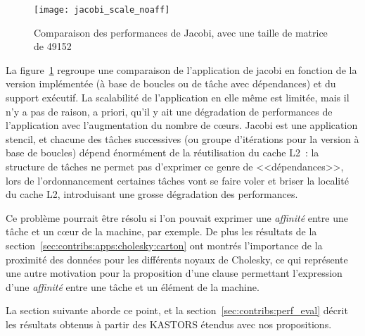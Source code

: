 \begin{figure}[ht]
  \centering
  \texttt{[image: jacobi\_scale\_noaff]}
  \caption{Comparaison des performances de Jacobi, avec une taille de matrice de 49152}\label{fig:contribs:openmp:kastors:jacobi-motiv}
\end{figure}

La figure~\ref{fig:contribs:openmp:kastors:jacobi-motiv} regroupe une comparaison de l'application de jacobi en fonction de la version implémentée (à base de boucles ou de tâche avec dépendances) et du support exécutif.
La scalabilité de l'application en elle même est limitée, mais il n'y a pas de raison, a priori, qu'il y ait une dégradation de performances de l'application avec l'augmentation du nombre de cœurs.
Jacobi est une application stencil, et chacune des tâches successives (ou groupe d'itérations pour la version à base de boucles) dépend énormément de la réutilisation du cache L2~: la structure de tâches ne permet pas d'exprimer ce genre de <<dépendances>>, lors de l'ordonnancement certaines tâches vont se faire voler et briser la localité du cache L2, introduisant une grosse dégradation des performances.

Ce problème pourrait être résolu si l'on pouvait exprimer une \emph{affinité} entre une tâche et un cœur de la machine, par exemple.
De plus les résultats de la section~\ref{sec:contribs:apps:cholesky:carton} ont montrés l'importance de la proximité des données pour les différents noyaux de Cholesky, ce qui représente une autre motivation pour la proposition d'une clause permettant l'expression d'une \emph{affinité} entre une tâche et un élément de la machine.

La section suivante aborde ce point, et la section~\ref{sec:contribs:perf_eval} décrit les résultats obtenus à partir des KASTORS étendus avec nos propositions.

